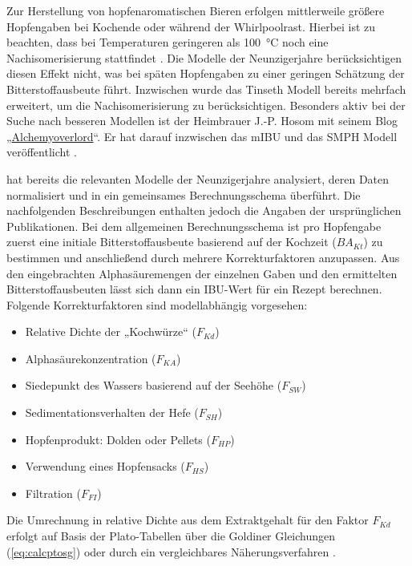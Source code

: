\documentclass[a4paper,parskip=half]{scrartcl}
\newcommand{\BAKt}{{\mathit{BA}}_{\mathit{Kt}}}
\newcommand{\FKd}{F_{\mathit{Kd}}}
\newcommand{\FHR}{F_{\mathit{KA}}}
\newcommand{\FSP}{F_{\mathit{SW}}}
\newcommand{\FAH}{F_{\mathit{SH}}}
\newcommand{\FHF}{F_{\mathit{HP}}}
\newcommand{\FHS}{F_{\mathit{HS}}}
\newcommand{\FFil}{F_{\mathit{FI}}}
\begin{document}
Zur Herstellung von hopfenaromatischen Bieren erfolgen mittlerweile größere Hopfengaben bei Kochende oder während der Whirlpoolrast. Hierbei ist zu beachten, dass bei Temperaturen geringeren als 100~°C noch eine Nachisomerisierung stattfindet \parencite{Weiss2019}. Die Modelle der Neunzigerjahre berücksichtigen diesen Effekt nicht, was bei späten Hopfengaben zu einer geringen Schätzung der Bitterstoffausbeute führt. Inzwischen wurde das Tinseth Modell bereits mehrfach erweitert, um die Nachisomerisierung zu berücksichtigen. Besonders aktiv bei der Suche nach besseren Modellen ist der Heimbrauer J.-P. Hosom mit seinem Blog „\href{https://jphosom.github.io/alchemyoverlord}{Alchemyoverlord}“. Er hat darauf inzwischen das mIBU und das SMPH Modell veröffentlicht \parencites{Hosom2015}{Hosom2021}.

\textcite{Hall1997} hat bereits die relevanten Modelle der Neunzigerjahre analysiert, deren Daten normalisiert und in ein gemeinsames Berechnungsschema überführt. Die nachfolgenden Beschreibungen enthalten jedoch die Angaben der ursprünglichen Publikationen. Bei dem allgemeinen Berechnungsschema ist pro Hopfengabe zuerst eine initiale Bitterstoffausbeute basierend auf der Kochzeit ($\BAKt$) zu bestimmen und anschließend durch mehrere Korrekturfaktoren anzupassen. Aus den eingebrachten Alphasäuremengen der einzelnen Gaben und den ermittelten Bitterstoffausbeuten lässt sich dann ein IBU-Wert für ein Rezept berechnen. Folgende Korrekturfaktoren sind modellabhängig vorgesehen:

\begin{itemize}
\item Relative Dichte der „Kochwürze“ ($\FKd$)
\item Alphasäurekonzentration ($\FHR$)
\item Siedepunkt des Wassers basierend auf der Seehöhe ($\FSP$)
\item Sedimentationsverhalten der Hefe ($\FAH$)
\item Hopfenprodukt: Dolden oder Pellets ($\FHF$)
\item Verwendung eines Hopfensacks ($\FHS$)
\item Filtration ($\FFil$)
\end{itemize}

Die Umrechnung in relative Dichte aus dem Extraktgehalt für den Faktor $\FKd$  erfolgt auf Basis der Plato-Tabellen über die Goldiner Gleichungen (\autoref{eq:calcptosg}) oder durch ein vergleichbares Näherungsverfahren \parencite[140\psq]{Spedding2016}.
\end{document}
